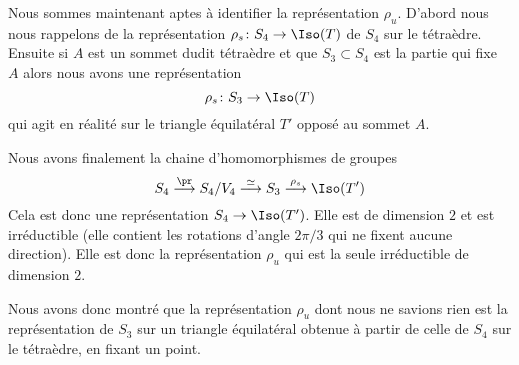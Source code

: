 \begin{normaltext}      \label{NORMooQQCYooILyOxc}
	Nous sommes maintenant aptes à identifier la représentation \( \rho_u\). D'abord nous nous rappelons de la représentation \( \rho_s\colon S_4\to \Iso(T)\) de \( S_4\) sur le tétraèdre. Ensuite si \( A\) est un sommet dudit tétraèdre et que \( S_3\subset S_4\) est la partie qui fixe \( A\) alors nous avons une représentation
	\begin{equation}
		\rho_s\colon S_3\to \Iso(T)
	\end{equation}
	qui agit en réalité sur le triangle équilatéral \( T'\) opposé au sommet \( A\).

	Nous avons finalement la chaine d'homomorphismes de groupes
	\begin{equation}
		S_4\stackrel{\pr}{\longrightarrow} S_4/V_4\stackrel{\simeq}{\longrightarrow} S_3\stackrel{\rho_s}{\longrightarrow}\Iso(T')
	\end{equation}
	Cela est donc une représentation \( S_4\to\Iso(T')\). Elle est de dimension \( 2\) et est irréductible (elle contient les rotations d'angle \( 2\pi/3\) qui ne fixent aucune direction). Elle est donc la représentation \( \rho_u\) qui est la seule irréductible de dimension \( 2\).

	Nous avons donc montré que la représentation \( \rho_u\) dont nous ne savions rien est la représentation de \( S_3\) sur un triangle équilatéral obtenue à partir de celle de \( S_4\) sur le tétraèdre, en fixant un point.
\end{normaltext}
